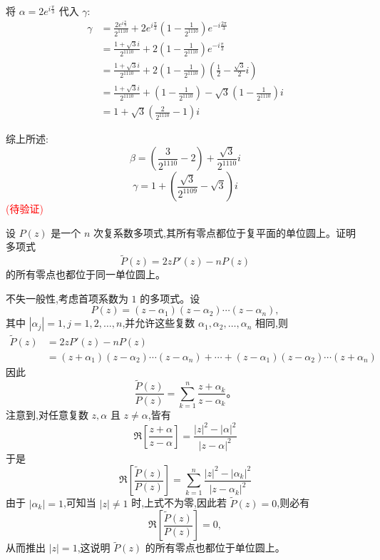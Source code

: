 \begin{questions}
\begin{solution}
将 $\alpha = 2e^{i\frac{\pi}{3}}$ 代入 $\gamma$:
\begin{align*}
\gamma &= \frac{2e^{i\frac{\pi}{3}}}{2^{1110}} + 2e^{i\frac{\pi}{3}}\left(1 - \frac{1}{2^{1110}}\right)e^{-i\frac{2\pi}{3}} \\
&= \frac{1 + \sqrt{3}i}{2^{1110}} + 2\left(1 - \frac{1}{2^{1110}}\right)e^{-i\frac{\pi}{3}} \\
&= \frac{1 + \sqrt{3}i}{2^{1110}} + 2\left(1 - \frac{1}{2^{1110}}\right)\left(\frac{1}{2} - \frac{\sqrt{3}}{2}i\right) \\
&= \frac{1 + \sqrt{3}i}{2^{1110}} + \left(1 - \frac{1}{2^{1110}}\right) - \sqrt{3}\left(1 - \frac{1}{2^{1110}}\right)i \\
&= 1 + \sqrt{3}\left(\frac{2}{2^{1110}} - 1\right)i
\end{align*}

综上所述:
\[ \beta = \left( \frac{3}{2^{1110}} - 2 \right) + \frac{\sqrt{3}}{2^{1110}}i \]
\[ \gamma = 1 + \left( \frac{\sqrt{3}}{2^{1109}} - \sqrt{3} \right)i \]
\textcolor{red}{(待验证)}
\end{solution}

    \question 设 $P(z)$ 是一个 $n$ 次复系数多项式,其所有零点都位于复平面的单位圆上。证明多项式
    \[
    \tilde{P}(z)=2zP'(z)-nP(z)
    \]
    的所有零点也都位于同一单位圆上。
    \begin{solution}
        不失一般性,考虑首项系数为 $1$ 的多项式。设
        \[
        P(z)=(z-\alpha_1)(z-\alpha_2)\cdots(z-\alpha_n),
        \]
        其中 $|\alpha_j|=1,j=1,2,\ldots,n$,并允许这些复数 $\alpha_1,\alpha_2,\ldots,\alpha_n$ 相同,则
        \begin{align*}
        \tilde{P}(z)&=2zP'(z)-nP(z)\\
        &=(z+\alpha_1)(z-\alpha_2)\cdots(z-\alpha_n)+\cdots+(z-\alpha_1)(z-\alpha_2)\cdots(z+\alpha_n)
        \end{align*}
        因此
        \[
        \frac{\tilde{P}(z)}{P(z)}=\sum_{k=1}^n \frac{z+\alpha_k}{z-\alpha_k}。
        \]
        注意到,对任意复数 $z,\alpha$ 且 $z\neq\alpha$,皆有
        \[
        \Re\left[\frac{z+\alpha}{z-\alpha}\right]
        =\frac{|z|^2-|\alpha|^2}{|z-\alpha|^2}
        \]
        于是
        \[
        \Re\left[\frac{\tilde{P}(z)}{P(z)}\right]
        =\sum_{k=1}^n \frac{|z|^2-|\alpha_k|^2}{|z-\alpha_k|^2}
        \]
        由于 $|\alpha_k|=1$,可知当 $|z|\neq1$ 时,上式不为零,因此若 $\tilde{P}(z)=0$,则必有
        \[
        \Re\left[\frac{\tilde{P}(z)}{P(z)}\right]=0,
        \]
        从而推出 $|z|=1$,这说明 $\tilde{P}(z)$ 的所有零点也都位于单位圆上。
    \end{solution}


\end{questions}
